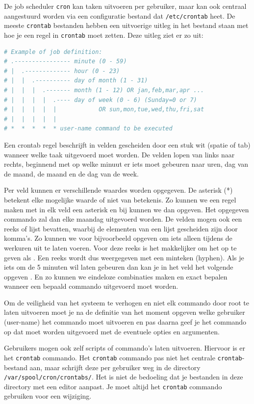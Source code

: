 De job scheduler \texttt{cron} kan taken uitvoeren per gebruiker, maar kan ook centraal aangestuurd worden via een configuratie bestand dat \texttt{/etc/crontab} heet. De meeste \texttt{crontab} bestanden hebben een uitvoerige uitleg in het bestand staan met hoe je een regel in \texttt{crontab} moet zetten. Deze uitleg ziet er zo uit:

\begin{lstlisting}[language=bash]
# Example of job definition:
# .---------------- minute (0 - 59)
# |  .------------- hour (0 - 23)
# |  |  .---------- day of month (1 - 31)
# |  |  |  .------- month (1 - 12) OR jan,feb,mar,apr ...
# |  |  |  |  .---- day of week (0 - 6) (Sunday=0 or 7)
# |  |  |  |  |            OR sun,mon,tue,wed,thu,fri,sat
# |  |  |  |  |
# *  *  *  *  * user-name command to be executed
\end{lstlisting}

Een crontab regel beschrijft in velden gescheiden door een stuk wit (spatie of tab) wanneer welke taak uitgevoerd moet worden. De velden lopen van links naar rechts, beginnend met op welke minuut er iets moet gebeuren naar uren, dag van de maand, de maand en de dag van de week.

Per veld kunnen er verschillende waardes worden opgegeven. De asterisk (*) betekent elke mogelijke waarde of niet van betekenis. Zo kunnen we een regel maken met in elk veld een asterisk en bij  kunnen we dan  opgeven. Het opgegeven commando zal dan elke maandag uitgevoerd worden. De velden mogen ook een reeks of lijst bevatten, waarbij de elementen van een lijst gescheiden zijn door komma's. Zo kunnen we voor  bijvoorbeeld opgeven  om iets alleen tijdens de werkuren uit te laten voeren. Voor deze reeks is het makkelijker om het op te geven als . Een reeks wordt dus weergegeven met een minteken (hyphen). Als je iets om de 5 minuten wil laten gebeuren dan kan je in het  veld het volgende opgeven . En zo kunnen we eindeloze combinaties maken en exact bepalen wanneer een bepaald commando uitgevoerd moet worden.

Om de veiligheid van het systeem te verhogen en niet elk commando door root te laten uitvoeren moet je na de definitie van het moment opgeven welke gebruiker (user-name) het commando moet uitvoeren en pas daarna geef je het commando op dat moet worden uitgevoerd met de eventuele opties en argumenten.

Gebruikers mogen ook zelf scripts of commando's laten uitvoeren. Hiervoor is er het \texttt{crontab} commando. Het \texttt{crontab} commando pas niet het centrale \texttt{crontab}-bestand aan, maar schrijft deze per gebruiker weg in de directory \texttt{/var/spool/cron/crontabs/}. Het is niet de bedoeling dat je bestanden in deze directory met een editor aanpast. Je moet altijd het \texttt{crontab} commando gebruiken voor een wijziging.

